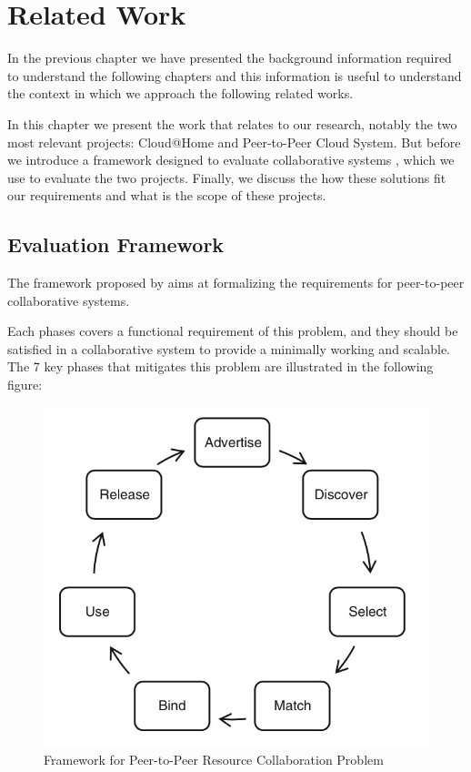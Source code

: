 \documentclass[12pt, titlepage]{uo_temp}
\begin{document}
     \chapter{Related Work}\label{rel_work}
     In the previous chapter we have presented the background information required to
     understand the following chapters and this information is useful to understand the
     context in which we approach the following related works.

     In this chapter we present the work that relates to our research, notably the two
     most relevant projects: Cloud@Home and Peer-to-Peer Cloud System. But before we
     introduce a framework designed to evaluate collaborative systems \cite{p2p_collab},
     which we use to evaluate the two projects. Finally, we discuss the how these
     solutions fit our requirements and what is the scope of these projects.
     
     \section{Evaluation Framework}\label{rel_EvalFramework}
     The framework proposed by \cite{p2p_collab} aims at formalizing the requirements for
     peer-to-peer collaborative systems.

     Each phases covers a functional requirement of this problem, and they should be
     satisfied in a collaborative system to provide a minimally working and scalable. The
     7 key phases that mitigates this problem are illustrated in the following figure:

       \begin{figure}[h]
         \includegraphics[width=125mm]{images/p2p_collab.jpg}
         \caption{Framework for Peer-to-Peer Resource Collaboration Problem\label{p2p_collab_fig)}}
       \end{figure}
       
\end{document}
